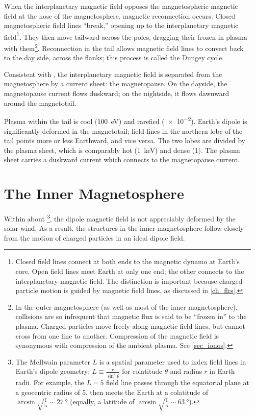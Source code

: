 When the interplanetary magnetic field opposes the magnetospheric magnetic field at the nose of the magnetosphere, magnetic reconnection occurs. Closed magnetospheric field lines ``break,'' opening up to the interplanetary magnetic field\footnote{Closed field lines connect at both ends to the magnetic dynamo at Earth's core. Open field lines meet Earth at only one end; the other connects to the interplanetary magnetic field. The distinction is important because charged particle motion is guided by magnetic field lines, as discussed in \cref{ch_flrs}. }. They then move tailward across the poles, dragging their frozen-in plasma with them\footnote{In the outer magnetosphere (as well as most of the inner magnetosphere), collisions are so infrequent that magnetic flux is said to be ``frozen in'' to the plasma. Charged particles move freely along magnetic field lines, but cannot cross from one line to another. Compression of the magnetic field is synonymous with compression of the ambient plasma. See \cref{sec_ionos}. }. Reconnection in the tail allows magnetic field lines to convect back to the day side, across the flanks; this process is called the Dungey cycle\cite{dungey_1961}. 

Consistent with \amplaw, the interplanetary magnetic field is separated from the magnetosphere by a current sheet: the magnetopause. On the dayside, the magnetopause current flows duskward; on the nightside, it flows dawnward around the magnetotail. 

Plasma within the tail is cool (\about\SI{100}{\eV}) and rarefied (\about\SI{e-2}{\percc}). Earth's dipole is significantly deformed in the magnetotail; field lines in the northern lobe of the tail points more or less Earthward, and vice versa. The two lobes are divided by the plasma sheet, which is comparably hot (\about\SI{1}{\keV}) and dense (\about\SI{1}{\percc}). The plasma sheet carries a duskward current which connects to the magnetopause current. 

\section{The Inner Magnetosphere}

Within about \footnote{The McIlwain parameter $L$ is a spatial parameter used to index field lines in Earth's dipole geometry: $L \equiv \frac{r}{\sin^2\theta}$ for colatitude $\theta$ and radius $r$ in Earth radii. For example, the $L=5$ field line passes through the equatorial plane at a geocentric radius of \SI{5}{\RE}, then meets the Earth at a colatitude of $\arcsin \sqrt{ \frac{1}{5} } \sim \SI{27}{\degree}$ (equally, a latitude of $\arcsin \sqrt{ \frac{1}{5} } \sim \SI{63}{\degree}$). }, the dipole magnetic field is not appreciably deformed by the solar wind. As a result, the structures in the inner magnetosphere follow closely from the motion of charged particles in an ideal dipole field. 

